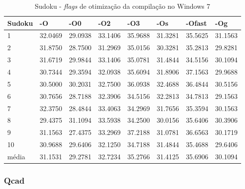 \begin{apendicesenv}
\begin{table}[!ht]
\centering
\tiny
\caption{Sudoku - \textit{flags} de otimização da compilação no Windows 7}
\label{tab:otimizacao_compilacao:windows:sudoku}
\begin{tabular}{llllllll}
\textbf{Sudoku}    & \textbf{-O}  & \textbf{-O0}   & \textbf{-O2} & \textbf{-O3} & \textbf{-Os} & \textbf{-Ofast} & \textbf{-Og} \\ \toprule
1                  & 32.0469      & 29.0938        & 33.1406      & 35.9688      & 31.3281      & 35.5625         & 31.1563     \\ 
2                  & 31.8750      & 28.7500        & 31.2969      & 35.0156      & 30.3281      & 35.2813         & 29.8281     \\ 
3                  & 31.6719      & 29.9844        & 33.1406      & 35.0781      & 31.4844      & 34.5156         & 30.1094     \\ 
4                  & 30.7344      & 29.3594        & 32.0938      & 35.6094      & 31.8906      & 37.1563         & 29.9688     \\ 
5                  & 30.5000      & 30.2031        & 32.7500      & 36.0938      & 32.4688      & 36.4844         & 30.5156     \\ 
6                  & 30.7656      & 28.7188        & 32.3906      & 34.5156      & 32.2813      & 34.7813         & 29.1563     \\ 
7                  & 32.3750      & 28.4844        & 33.4063      & 34.2969      & 31.7656      & 35.3594         & 30.1563     \\ 
8                  & 29.4375      & 31.1094        & 33.5938      & 34.2500      & 30.0156      & 35.6406         & 30.3906     \\ 
9                  & 31.1563      & 27.4375        & 33.2969      & 37.2188      & 31.0781      & 36.6563         & 30.1719     \\ 
10                 & 30.9688      & 29.6406        & 32.1250      & 34.7188      & 31.4844      & 35.4688         & 29.6406     \\ \bottomrule
média              & 31.1531      & 29.2781        & 32.7234      & 35.2766      & 31.4125      & 35.6906         & 30.1094     \\ 
\end{tabular}
\end{table}

\clearpage
\subsubsection*{Qcad}


\end{apendicesenv}
